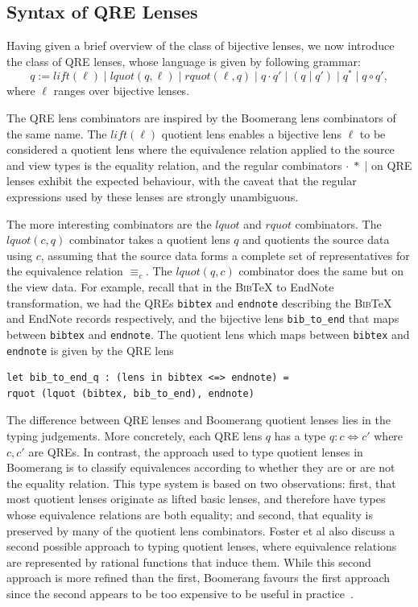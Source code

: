 \documentclass{svproc}
\newcommand{\cd}[1]{\lstinline[backgroundcolor=\color{white}]$#1$}
\newcommand{\sep}{\ensuremath{\; | \;}}
\newcommand{\bibtex}{\textsc{Bib}\TeX{}}
\newcommand{\eqrel}[1]{\ensuremath{\equiv_{#1}}}
\begin{document}
\subsection{Syntax of QRE Lenses}
Having given a brief overview of the class of bijective lenses, we now introduce
the class of QRE lenses, whose language is given by following grammar:
$$ q := \mathit{lift}(\ell) \sep \mathit{lquot}(q, \ell) \sep
\mathit{rquot}(\ell, q) \sep q \cdot q' \sep (q \sep q') \sep q^* \sep q \circ q',$$
where $\ell$ ranges over bijective lenses.

The QRE lens combinators are inspired by the Boomerang lens combinators of the
same name. The $\mathit{lift}(\ell)$ quotient lens enables a bijective lens
$\ell$ to be considered a quotient lens where the equivalence relation applied
to the source and view types is the equality relation, and the regular
combinators $\cdot \; * \; |$ on QRE lenses exhibit the expected behaviour,
with the caveat that the regular expressions used by these lenses are strongly
unambiguous.

The more interesting combinators are the $\mathit{lquot}$ and $\mathit{rquot}$
combinators. The $\mathit{lquot}(c, q)$ combinator takes a quotient lens $q$ and
quotients the source data using $c$, assuming that the source data forms a
complete set of representatives for the equivalence relation $\eqrel{c}$. The
$\mathit{lquot}(q, c)$ combinator does the same but on the view data. For
example, recall that in the \bibtex{} to EndNote transformation, we had the QREs
\cd{bibtex} and \cd{endnote} describing the \bibtex{} and EndNote records
respectively, and the bijective lens \cd{bib_to_end} that maps between
\cd{bibtex} and \cd{endnote}. The quotient lens which maps between
\cd{bibtex} and \cd{endnote} is given by the QRE lens

\begin{lstlisting}
let bib_to_end_q : (lens in bibtex <=> endnote) = 
rquot (lquot (bibtex, bib_to_end), endnote)
 \end{lstlisting} 
 
The difference between QRE lenses and Boomerang quotient lenses lies in the
typing judgements. More concretely, each QRE lens $q$ has a type $q : c
\Leftrightarrow c'$ where $c, c'$ are QREs. In contrast, the approach used to
type quotient lenses in Boomerang is to classify equivalences according to
whether they are or are not the equality relation. This type system is based on
two observations: first, that most quotient lenses originate as lifted basic
lenses, and therefore have types whose equivalence relations are both equality;
and second, that equality is preserved by many of the quotient lens
combinators. Foster et al also discuss a second possible approach to typing
quotient lenses, where equivalence relations are represented by rational
functions that induce them. While this second approach is more refined than the
first, Boomerang favours the first approach since the second appears to be too
expensive to be useful in practice~\cite{quotientlenses}.
\end{document}

